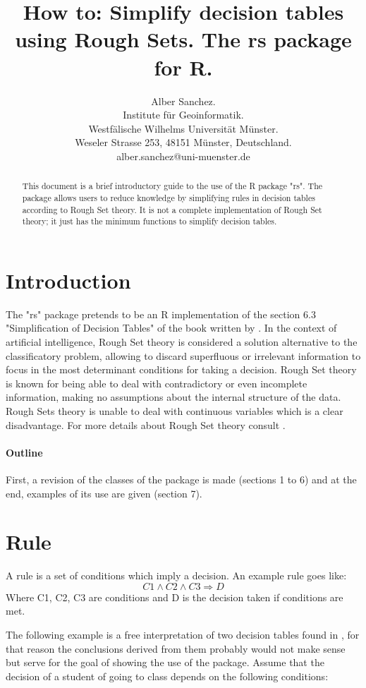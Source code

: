 \documentclass[a4paper]{article}
\title{How to: Simplify decision tables using Rough Sets. The rs package for R.}
\author{Alber Sanchez.\\Institute f\"{u}r Geoinformatik.\\Westf\"{a}lische Wilhelms Universit\"{a}t M\"{u}nster.\\ Weseler Strasse 253, 48151 M\"{u}nster, Deutschland.\\alber.sanchez@uni-muenster.de}
\begin{document}


\maketitle

\begin{abstract}
This document is a brief introductory guide to the use of the R package "rs". The package allows users to reduce knowledge by simplifying rules in decision tables according to Rough Set theory. It is not a complete implementation of Rough Set theory; it just has the minimum functions to simplify decision tables.
\end{abstract}

\tableofcontents

\section{Introduction}
The "rs" package pretends to be an R implementation of the section 6.3 "Simplification of Decision Tables" of the book written by \cite{pawlak}. In the context of artificial intelligence, Rough Set theory is considered a solution alternative to the classificatory problem, allowing to discard superfluous or irrelevant information to focus in the most determinant conditions for taking a decision. Rough Set theory is known for being able to deal with contradictory or even incomplete information, making no assumptions about the internal structure of the data. Rough Sets theory is unable to deal with continuous variables which is a clear disadvantage. For more details about Rough Set theory consult \cite{pawlak}.

\paragraph{Outline}
First, a revision of the classes of the package is made (sections 1 to 6) and at the end, examples of its use are given (section 7).

\section{Rule}
A rule is a set of conditions which imply a decision. An example rule goes like:
\[C1 \wedge C2 \wedge C3 \Rightarrow D\]
Where C1, C2, C3 are conditions and D is the decision taken if conditions are met.  

The following example is a free interpretation of two decision tables found in \cite{pawlak}, for that reason the conclusions derived from them probably would not make sense but serve for the goal of showing the use of the package. Assume that the decision of a student of going to class depends on the following conditions:
\end{document}
